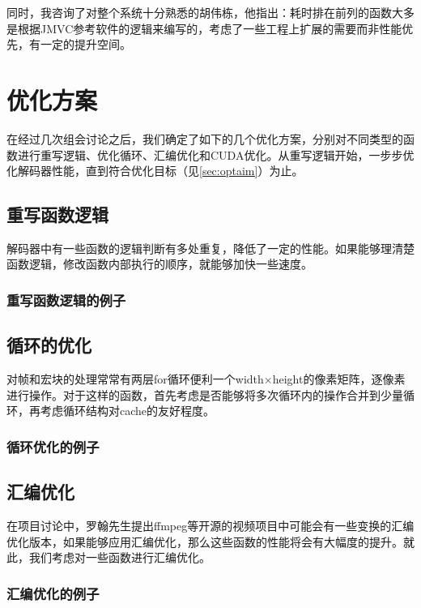 同时，我咨询了对整个系统十分熟悉的胡伟栋，他指出：耗时排在前列的函数大多是根据JMVC参考软件的逻辑来编写的，考虑了一些工程上扩展的需要而非性能优先，有一定的提升空间。

\section{优化方案}
\label{sec:optapproach}

在经过几次组会讨论之后，我们确定了如下的几个优化方案，分别对不同类型的函数进行重写逻辑、优化循环、汇编优化和CUDA优化。从重写逻辑开始，一步步优化解码器性能，直到符合优化目标（见\ref{sec:optaim}）为止。

\subsection{重写函数逻辑}
\label{subsec:rewritelogic}

解码器中有一些函数的逻辑判断有多处重复，降低了一定的性能。如果能够理清楚函数逻辑，修改函数内部执行的顺序，就能够加快一些速度。

\subsubsection{重写函数逻辑的例子}
\label{subsubsec:egrewritelogic}

\subsection{循环的优化}
\label{subsec:loopopt}

对帧和宏块的处理常常有两层for循环便利一个width$\times$height的像素矩阵，逐像素进行操作。对于这样的函数，首先考虑是否能够将多次循环内的操作合并到少量循环，再考虑循环结构对cache的友好程度。

\subsubsection{循环优化的例子}
\label{subsubsec:egloopopt}

\subsection{汇编优化}
\label{subsec:asmopt}

在项目讨论中，罗翰先生提出ffmpeg等开源的视频项目中可能会有一些变换的汇编优化版本，如果能够应用汇编优化，那么这些函数的性能将会有大幅度的提升。就此，我们考虑对一些函数进行汇编优化。

\subsubsection{汇编优化的例子}
\label{subsubsec:egasmopt}

